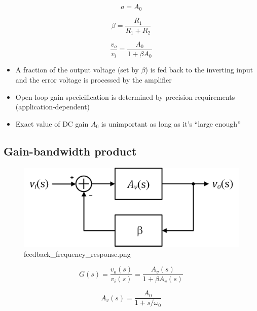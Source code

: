\documentclass[11pt]{article}
\providecommand{\tightlist}{%
      \setlength{\itemsep}{0pt}\setlength{\parskip}{0pt}}
\begin{document}
    \begin{equation}
a = A_{0}
\end{equation}

\begin{equation}
\beta = \dfrac{R_1}{R_1 + R_2}
\end{equation}

\begin{equation}
\dfrac{v_o}{v_i} = \dfrac{A_{0}}{1+\beta A_{0}}
\end{equation}

    \begin{itemize}
\tightlist
\item
  A fraction of the output voltage (set by \(\beta\)) is fed back to the
  inverting input and the error voltage is processed by the amplifier
\item
  Open-loop gain specicification is determined by precision requirements
  (application-dependent)
\item
  Exact value of DC gain \(A_0\) is unimportant as long as it's ``large
  enough''
\end{itemize}

    \hypertarget{gain-bandwidth-product}{%
\subsection{Gain-bandwidth product}\label{gain-bandwidth-product}}

    \begin{figure}
\centering
\includegraphics{feedback_frequency_response.png}
\caption{feedback\_frequency\_response.png}
\end{figure}

    \begin{equation}
G(s) = \dfrac{v_o(s)}{v_i(s)} = \dfrac{A_{v}(s)}{1+\beta A_{v}(s)}
\end{equation}

\begin{equation}
A_v(s) = \dfrac{A_0}{1+s/\omega_0}
\end{equation}
\end{document}

